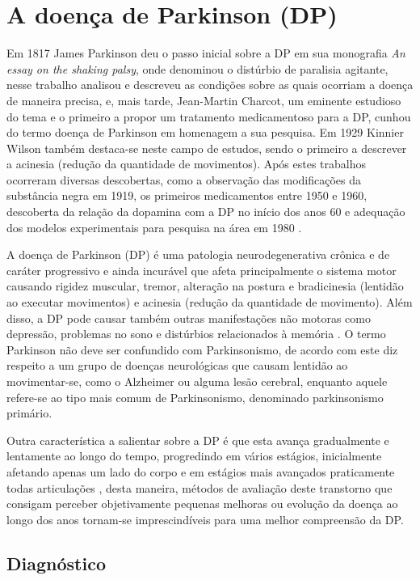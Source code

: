 \documentclass[
	12pt,				%
	openany,			%
	oneside,			%
	a4paper,			%
	english,			%
	french,				%
	spanish,			%
	brazil				%
	]{abntex2}
\begin{document}
\section{A doença de Parkinson (DP)}
Em 1817 James Parkinson deu o passo inicial sobre a DP em sua monografia \textit{An essay on the shaking palsy}, onde denominou o distúrbio de paralisia agitante, nesse trabalho analisou e descreveu as condições sobre as quais ocorriam a doença de maneira precisa, e, mais tarde, Jean-Martin Charcot, um eminente estudioso do tema e o primeiro a propor um tratamento medicamentoso para a DP, cunhou do termo doença de Parkinson em homenagem a sua pesquisa. Em 1929 Kinnier Wilson também destaca-se neste campo de estudos, sendo o primeiro a descrever a acinesia (redução da quantidade de movimentos). Após estes trabalhos ocorreram diversas descobertas, como a observação das modificações da substância negra em 1919, os primeiros medicamentos entre 1950 e 1960, descoberta da relação da dopamina com a DP no início dos anos 60 e adequação dos modelos experimentais para pesquisa na área em 1980 \cite{limongi2001,ebook2016}.

A doença de Parkinson (DP) é uma patologia neurodegenerativa crônica e de caráter progressivo e ainda incurável que afeta principalmente o sistema motor causando rigidez muscular, tremor, alteração na postura e bradicinesia (lentidão ao executar movimentos) e acinesia (redução da quantidade de movimento). Além disso, a DP pode causar também outras manifestações não motoras como depressão, problemas no sono e distúrbios relacionados à memória \cite{limongi2001}. O termo Parkinson não deve ser confundido com Parkinsonismo, de acordo com  este diz respeito a um grupo de doenças neurológicas que causam lentidão ao movimentar-se, como o Alzheimer ou alguma lesão cerebral, enquanto aquele refere-se ao tipo mais comum de Parkinsonismo, denominado parkinsonismo primário.

Outra característica a salientar sobre a DP é que esta avança gradualmente e lentamente ao longo do tempo, progredindo em vários estágios, inicialmente afetando apenas um lado do corpo e em estágios mais avançados praticamente todas articulações \cite{rewar2015}, desta maneira, métodos de avaliação deste transtorno que consigam perceber objetivamente pequenas melhoras ou evolução da doença ao longo dos anos tornam-se imprescindíveis para uma melhor compreensão da DP.


\subsection{Diagnóstico}
\end{document}
